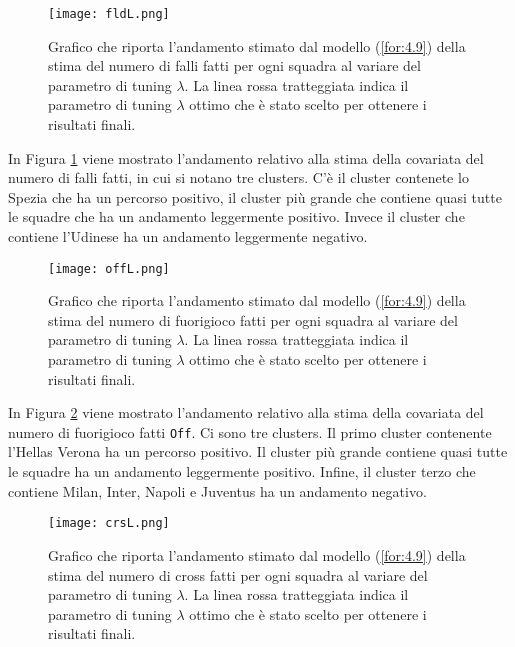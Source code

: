\begin{figure}[htbp]
	\begin{center}
		\texttt{[image: fldL.png]}
		\caption{Grafico che riporta l'andamento stimato dal modello (\ref{for:4.9}) della stima del numero di falli fatti per ogni squadra al variare del parametro di tuning $\lambda$. La linea rossa tratteggiata indica il parametro di tuning $\lambda$ ottimo che è stato scelto per ottenere i risultati finali.} \label{fig:fldL}
	\end{center}
\end{figure}

In Figura \ref{fig:fldL} viene mostrato l'andamento relativo alla stima della covariata del numero di falli fatti, in cui si notano tre clusters. C'è il cluster contenete lo Spezia che ha un percorso positivo, il cluster più grande che contiene quasi tutte le squadre che ha un andamento leggermente positivo. Invece il cluster che contiene l'Udinese ha un andamento leggermente negativo.

\begin{figure}[htbp]
	\begin{center}
		\texttt{[image: offL.png]}
		\caption{Grafico che riporta l'andamento stimato dal modello (\ref{for:4.9}) della stima del numero di fuorigioco fatti per ogni squadra al variare del parametro di tuning $\lambda$. La linea rossa tratteggiata indica il parametro di tuning $\lambda$ ottimo che è stato scelto per ottenere i risultati finali.} \label{fig:offL}
	\end{center}
\end{figure}

In Figura \ref{fig:offL} viene mostrato l'andamento relativo alla stima della covariata del numero di fuorigioco fatti \texttt{Off}. Ci sono tre clusters. Il primo cluster contenente l'Hellas Verona ha un percorso positivo. Il cluster più grande contiene quasi tutte le squadre ha un andamento leggermente positivo. Infine, il cluster terzo che contiene Milan, Inter, Napoli e Juventus ha un andamento negativo.

\begin{figure}[htbp]
	\begin{center}
		\texttt{[image: crsL.png]}
		\caption{Grafico che riporta l'andamento stimato dal modello (\ref{for:4.9}) della stima del numero di cross fatti per ogni squadra al variare del parametro di tuning $\lambda$. La linea rossa tratteggiata indica il parametro di tuning $\lambda$ ottimo che è stato scelto per ottenere i risultati finali.} \label{fig:crsL}
	\end{center}
\end{figure}

